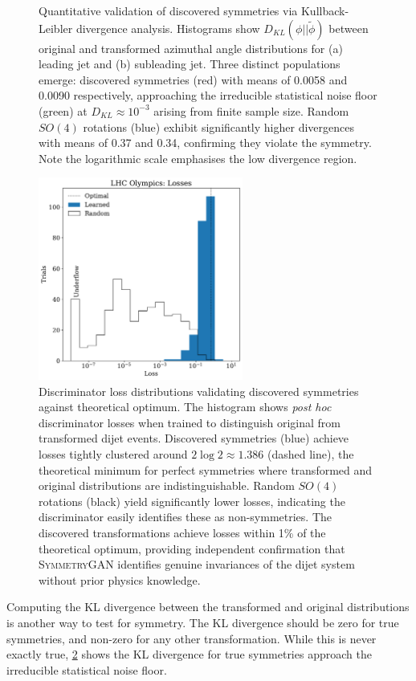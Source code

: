\begin{figure}
\begin{subfigure}[b]{0.45\textwidth}
        \caption{}
        \label{fig:KLdiv_ii}
    \end{subfigure}
    \caption[Kullback-Leibler divergence analysis showing discovered symmetries approach statistical noise floor.]{Quantitative validation of discovered symmetries via Kullback-Leibler divergence analysis. Histograms show $D_{KL}(\phi || \tilde{\phi})$ between original and transformed azimuthal angle distributions for (a) leading jet and (b) subleading jet. Three distinct populations emerge: discovered symmetries (red) with means of 0.0058 and 0.0090 respectively, approaching the irreducible statistical noise floor (green) at $D_{KL} \approx 10^{-3}$ arising from finite sample size. Random $SO(4)$ rotations (blue) exhibit significantly higher divergences with means of 0.37 and 0.34, confirming they violate the symmetry. Note the logarithmic scale emphasises the low divergence region.}
    \label{fig:KL-symm}
\end{figure}

\begin{figure}
    \centering
    \includegraphics[width=0.6\textwidth]{figures/chapter-09/LHCOLosses.pdf}
    \caption{Discriminator loss distributions validating discovered symmetries against theoretical optimum. The histogram shows \textit{ post hoc} discriminator losses when trained to distinguish original from transformed dijet events. Discovered symmetries (blue) achieve losses tightly clustered around $2\log 2 \approx 1.386$ (dashed line), the theoretical minimum for perfect symmetries where transformed and original distributions are indistinguishable.
    Random $SO(4)$ rotations (black) yield significantly lower losses, indicating the discriminator easily identifies these as non-symmetries. The discovered transformations achieve losses within 1\% of the theoretical optimum, providing independent confirmation that \textsc{SymmetryGAN} identifies genuine invariances of the dijet system without prior physics knowledge.}
    \label{fig:LHCOLosses}
\end{figure}            
            Computing the KL divergence between the transformed and original distributions is another way to test for symmetry.
            The KL divergence should be zero for true symmetries, and non-zero for any other transformation.
            While this is never exactly true, \cref{fig:KL-symm} shows the KL divergence for true symmetries approach the irreducible statistical noise floor.
            

